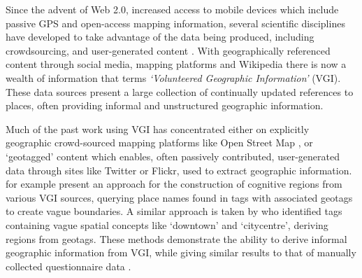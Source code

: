 \documentclass[]{interact}
\theoremstyle{plain}%
\theoremstyle{definition}
\theoremstyle{remark}
\begin{document}
Since the advent of Web 2.0, increased access to mobile devices which
include passive GPS and open-access mapping information, several
scientific disciplines have developed to take advantage of the data
being produced, including crowdsourcing, and user-generated content
\citep{see2016}. With geographically referenced content through social
media, mapping platforms and Wikipedia there is now a wealth of
information that \citet{goodchild2007} terms \emph{`Volunteered
Geographic Information'} (VGI). These data sources present a large
collection of continually updated references to places, often providing
informal and unstructured geographic information.

Much of the past work using VGI has concentrated either on explicitly
geographic crowd-sourced mapping platforms like Open Street Map
\citep{antoniou2010}, or `geotagged' content which enables, often
passively contributed, user-generated data through sites like Twitter or
Flickr, used to extract geographic information. \citet{gao2017} for
example present an approach for the construction of cognitive regions
from various VGI sources, querying place names found in tags with
associated geotags to create vague boundaries. A similar approach is
taken by \citet{hollenstein2010} who identified tags containing vague
spatial concepts like `downtown' and `citycentre', deriving regions from
geotags. These methods demonstrate the ability to derive informal
geographic information from VGI, while giving similar results to that of
manually collected questionnaire data \citep{twaroch2019, gao2017}.
\end{document}
